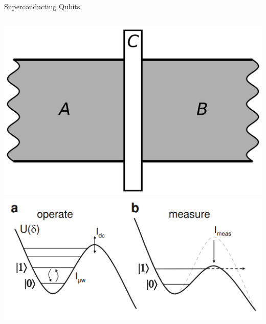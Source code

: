 \documentclass{beamer}
\begin{document}
\begin{frame}{Superconducting Qubits}
    \begin{columns}
        \includegraphics[width=\columnwidth]{images/Single_josephson_junction.svg.png}
        \includegraphics[width=\columnwidth]{images/phase_qubit.png}

    \end{columns}
\end{frame}
    
\end{document}
